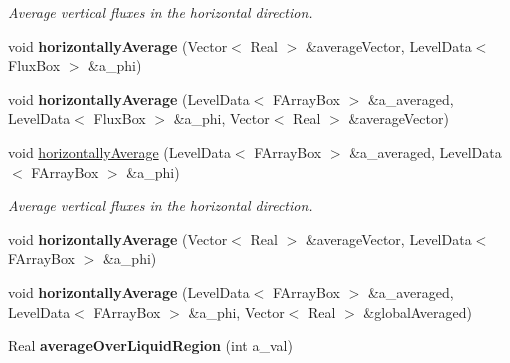 \begin{DoxyCompactItemize}
\begin{DoxyCompactList}\small\item\em Average vertical fluxes in the horizontal direction. \end{DoxyCompactList}\item 
\hypertarget{class_a_m_r_level_mushy_layer_a59d164085c308e534cdb44f558c56aed}{void {\bfseries horizontally\-Average} (Vector$<$ Real $>$ \&average\-Vector, Level\-Data$<$ Flux\-Box $>$ \&a\-\_\-phi)}\label{class_a_m_r_level_mushy_layer_a59d164085c308e534cdb44f558c56aed}

\item 
\hypertarget{class_a_m_r_level_mushy_layer_ace588d01606542a417a8d2d05c80c392}{void {\bfseries horizontally\-Average} (Level\-Data$<$ F\-Array\-Box $>$ \&a\-\_\-averaged, Level\-Data$<$ Flux\-Box $>$ \&a\-\_\-phi, Vector$<$ Real $>$ \&average\-Vector)}\label{class_a_m_r_level_mushy_layer_ace588d01606542a417a8d2d05c80c392}

\item 
\hypertarget{class_a_m_r_level_mushy_layer_a4467aac78f7a23f22a7d65d3441ffb8b}{void \hyperlink{class_a_m_r_level_mushy_layer_a4467aac78f7a23f22a7d65d3441ffb8b}{horizontally\-Average} (Level\-Data$<$ F\-Array\-Box $>$ \&a\-\_\-averaged, Level\-Data$<$ F\-Array\-Box $>$ \&a\-\_\-phi)}\label{class_a_m_r_level_mushy_layer_a4467aac78f7a23f22a7d65d3441ffb8b}

\begin{DoxyCompactList}\small\item\em Average vertical fluxes in the horizontal direction. \end{DoxyCompactList}\item 
\hypertarget{class_a_m_r_level_mushy_layer_a56619b718d89610566ede8f9a6f74270}{void {\bfseries horizontally\-Average} (Vector$<$ Real $>$ \&average\-Vector, Level\-Data$<$ F\-Array\-Box $>$ \&a\-\_\-phi)}\label{class_a_m_r_level_mushy_layer_a56619b718d89610566ede8f9a6f74270}

\item 
\hypertarget{class_a_m_r_level_mushy_layer_af2c7dbb0a17702772ed44fd557aff2ae}{void {\bfseries horizontally\-Average} (Level\-Data$<$ F\-Array\-Box $>$ \&a\-\_\-averaged, Level\-Data$<$ F\-Array\-Box $>$ \&a\-\_\-phi, Vector$<$ Real $>$ \&global\-Averaged)}\label{class_a_m_r_level_mushy_layer_af2c7dbb0a17702772ed44fd557aff2ae}

\item 
\hypertarget{class_a_m_r_level_mushy_layer_a7173a5848825f83a3692ff35bcb91631}{Real {\bfseries average\-Over\-Liquid\-Region} (int a\-\_\-val)}\label{class_a_m_r_level_mushy_layer_a7173a5848825f83a3692ff35bcb91631}


\end{DoxyCompactItemize}
